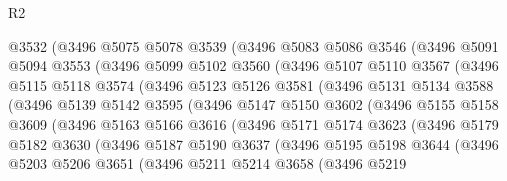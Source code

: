 \begin{lexlean}{R2}
\begin{coremodule}
          @3532
          (@3496
            @5075
            @5078
            @3539
            (@3496
              @5083
              @5086
              @3546
              (@3496
                @5091
                @5094
                @3553
                (@3496
                  @5099
                  @5102
                  @3560
                  (@3496
                    @5107
                    @5110
                    @3567
                    (@3496
                      @5115
                      @5118
                      @3574
                      (@3496
                        @5123
                        @5126
                        @3581
                        (@3496
                          @5131
                          @5134
                          @3588
                          (@3496
                            @5139
                            @5142
                            @3595
                            (@3496
                              @5147
                              @5150
                              @3602
                              (@3496
                                @5155
                                @5158
                                @3609
                                (@3496
                                  @5163
                                  @5166
                                  @3616
                                  (@3496
                                    @5171
                                    @5174
                                    @3623
                                    (@3496
                                      @5179
                                      @5182
                                      @3630
                                      (@3496
                                        @5187
                                        @5190
                                        @3637
                                        (@3496
                                          @5195
                                          @5198
                                          @3644
                                          (@3496
                                            @5203
                                            @5206
                                            @3651
                                            (@3496
                                              @5211
                                              @5214
                                              @3658
                                              (@3496
                                                @5219

\end{coremodule}
\end{lexlean}

